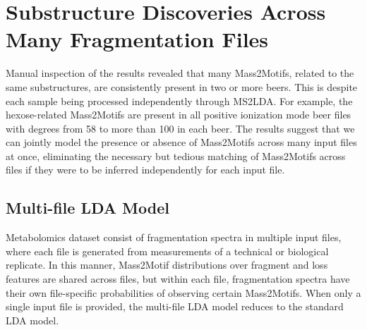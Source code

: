 \section{Substructure Discoveries Across Many Fragmentation Files}

Manual inspection of the results revealed that many Mass2Motifs, related to the same substructures, are consistently present in two or more beers. This is despite each sample being processed independently through MS2LDA. For example, the hexose-related Mass2Motifs are present in all positive ionization mode beer files with degrees from 58 to more than 100 in each beer. The results suggest that we can jointly model the presence or absence of Mass2Motifs across many input files at once, eliminating the necessary but tedious matching of Mass2Motifs across files if they were to be inferred independently for each input file.

\subsection{Multi-file LDA Model}

Metabolomics dataset consist of fragmentation spectra in multiple input files, where each file is generated from measurements of a technical or biological replicate. In this manner, Mass2Motif distributions over fragment and loss features are shared across files, but within each file, fragmentation spectra have their own file-specific probabilities of observing certain Mass2Motifs. When only a single input file is provided, the multi-file LDA model reduces to the standard LDA model. 

